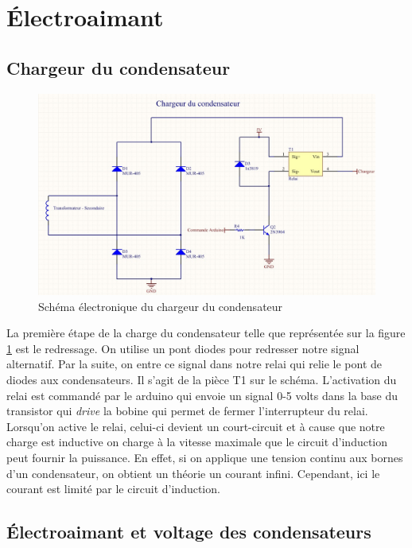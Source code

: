 \section{Électroaimant}

\subsection{Chargeur du condensateur}

  \begin{figure}[ht]
    \centering
    \includegraphics[scale=0.4]{resources/chargeur.jpg}
    \caption{Schéma électronique du chargeur du condensateur}
    \label{fig:chargeur}
  \end{figure}

La première étape de la charge du condensateur telle que représentée sur la figure \ref{fig:chargeur} est le redressage. On utilise un pont diodes pour redresser notre signal alternatif. Par la suite, on entre ce signal dans notre relai qui relie le pont de diodes aux condensateurs. Il s'agit de la pièce T1 sur le schéma. L'activation du relai est commandé par le arduino qui envoie un signal 0-5 volts dans la base du transistor qui \textit{drive} la bobine qui permet de fermer l'interrupteur du relai. Lorsqu'on active le relai, celui-ci devient un court-circuit et à cause que notre charge est inductive on charge à la vitesse maximale que le circuit d'induction peut fournir la puissance. En effet, si on applique une tension continu aux bornes d'un condensateur, on obtient un théorie un courant infini. Cependant, ici le courant est limité par le circuit d'induction.

\subsection{Électroaimant et voltage des condensateurs}

